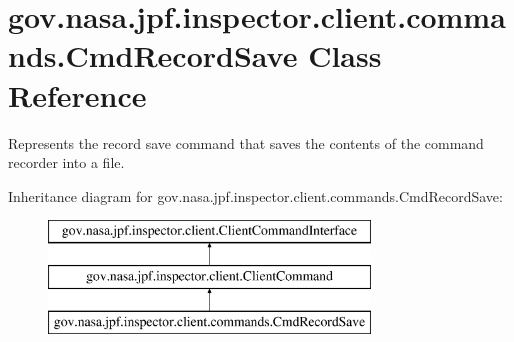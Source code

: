 \hypertarget{classgov_1_1nasa_1_1jpf_1_1inspector_1_1client_1_1commands_1_1_cmd_record_save}{}\section{gov.\+nasa.\+jpf.\+inspector.\+client.\+commands.\+Cmd\+Record\+Save Class Reference}
\label{classgov_1_1nasa_1_1jpf_1_1inspector_1_1client_1_1commands_1_1_cmd_record_save}


Represents the \textquotesingle{}record save\textquotesingle{} command that saves the contents of the command recorder into a file.  


Inheritance diagram for gov.\+nasa.\+jpf.\+inspector.\+client.\+commands.\+Cmd\+Record\+Save\+:\begin{figure}[H]
\begin{center}
\leavevmode
\includegraphics[height=3.000000cm]{classgov_1_1nasa_1_1jpf_1_1inspector_1_1client_1_1commands_1_1_cmd_record_save}
\end{center}
\end{figure}
